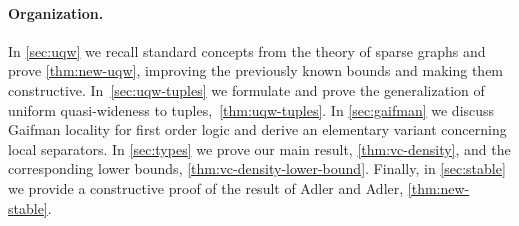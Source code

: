 \paragraph{Organization.} In \cref{sec:uqw} we recall standard concepts from the theory of sparse graphs and prove \cref{thm:new-uqw}, improving the previously known bounds and making them constructive.
In~\cref{sec:uqw-tuples} we formulate and prove the generalization of uniform quasi-wideness to tuples,~\cref{thm:uqw-tuples}. 
In \cref{sec:gaifman} we discuss Gaifman locality for first order logic and derive an elementary variant concerning local separators.
In \cref{sec:types} we prove our main result, \cref{thm:vc-density}, and the corresponding lower bounds, \cref{thm:vc-density-lower-bound}.
Finally, in \cref{sec:stable} we provide a constructive proof of the result of Adler and Adler, \cref{thm:new-stable}.
